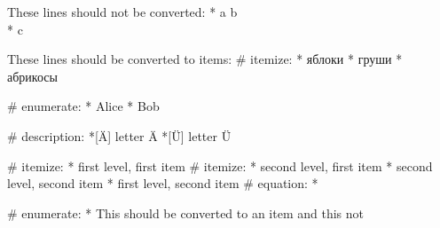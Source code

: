 These lines should not be converted:
* a
\* b
\\* c


These lines should be converted to items:
# itemize:
  * яблоки
  * груши
  * абрикосы

# enumerate:
  * Alice
  * Bob

# description:
  *[Ä] letter Ä
  *[Ü] letter Ü


# itemize:
  * first level, first item
    # itemize:
      * second level, first item
      * second level, second item
  * first level, second item
    # equation:
      * %


# enumerate:
  * This should be converted to an item
  \* and this not
